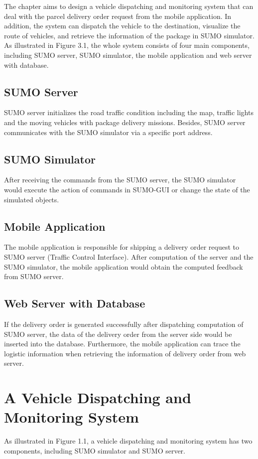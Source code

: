 \documentclass[12pt]{ksthesis}
\begin{document}
\begin{thesis}
{The chapter aims to design a vehicle dispatching and monitoring system that can deal with the parcel delivery order request from the mobile application. In addition, the system can dispatch the vehicle to the destination, visualize the route of vehicles, and retrieve the information of the package in SUMO simulator.
As illustrated in Figure 3.1, the whole system consists of four main components, including SUMO server, SUMO simulator, the mobile application and web server with database.

\subsection{SUMO Server}
SUMO server initializes the road traffic condition including the map, traffic lights and the moving vehicles with package delivery missions. Besides, SUMO server communicates with the SUMO simulator via a specific port address.

\subsection{SUMO Simulator}
After receiving the commands from the SUMO server, the SUMO simulator would execute the action of commands in SUMO-GUI or change the state of the simulated objects.

\subsection{Mobile Application}
The mobile application is responsible for shipping a delivery order request to SUMO server (Traffic Control Interface). After computation of the server and the SUMO simulator, the mobile application would obtain the computed feedback from SUMO server.

\subsection{Web Server with Database}
If the delivery order is generated successfully after dispatching computation of SUMO server, the data of the delivery order from the server side would be inserted into the database. Furthermore, the mobile application can trace the logistic information when retrieving the information of delivery order from web server.

\section{A Vehicle Dispatching and Monitoring System}
As illustrated in Figure 1.1, a vehicle dispatching and monitoring system has two components, including SUMO simulator and SUMO server.



}
\end{thesis}
\end{document}
